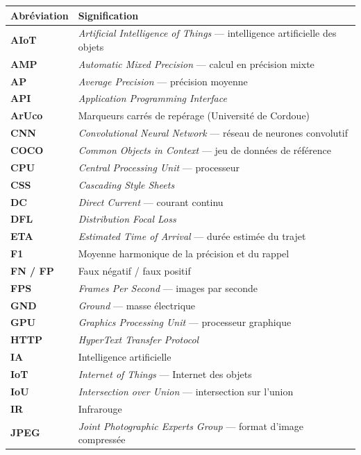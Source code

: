 
\begin{center}
\renewcommand{\arraystretch}{1.25}
\begin{longtable}{>{\bfseries}p{2.6cm} p{12cm}}
\toprule
Abréviation & Signification \\
\midrule
\endhead
AIoT   & \textit{Artificial Intelligence of Things} — intelligence artificielle des objets \\
AMP    & \textit{Automatic Mixed Precision} — calcul en précision mixte \\
AP     & \textit{Average Precision} — précision moyenne \\
API    & \textit{Application Programming Interface} \\
ArUco  & Marqueurs carrés de repérage (Université de Cordoue) \\
CNN    & \textit{Convolutional Neural Network} — réseau de neurones convolutif \\
COCO   & \textit{Common Objects in Context} — jeu de données de référence \\
CPU    & \textit{Central Processing Unit} — processeur \\
CSS    & \textit{Cascading Style Sheets} \\
DC     & \textit{Direct Current} — courant continu \\
DFL    & \textit{Distribution Focal Loss} \\
ETA    & \textit{Estimated Time of Arrival} — durée estimée du trajet \\
F1     & Moyenne harmonique de la précision et du rappel \\
FN / FP & Faux négatif / faux positif \\
FPS    & \textit{Frames Per Second} — images par seconde \\
GND    & \textit{Ground} — masse électrique \\
GPU    & \textit{Graphics Processing Unit} — processeur graphique \\
HTTP   & \textit{HyperText Transfer Protocol} \\
IA     & Intelligence artificielle \\
IoT    & \textit{Internet of Things} — Internet des objets \\
IoU    & \textit{Intersection over Union} — intersection sur l'union \\
IR     & Infrarouge \\
JPEG   & \textit{Joint Photographic Experts Group} — format d'image compressée \\

\end{longtable}
\end{center}

